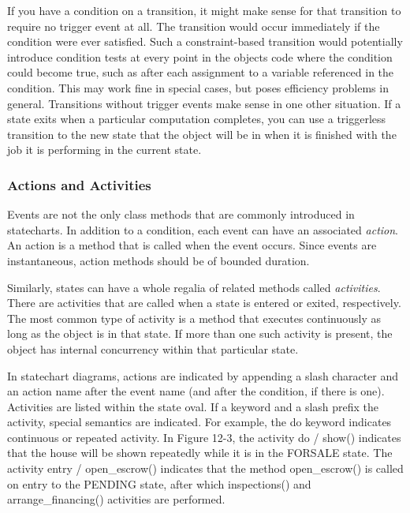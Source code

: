 If you have a condition on a transition, it might make sense for that
transition to require no trigger event at all. The transition would
occur immediately if the condition were ever satisfied. Such a
constraint-based transition would potentially introduce condition tests
at every point in the object{\textquotesingle}s code where the
condition could become true, such as after each assignment to a
variable referenced in the condition. This may work fine in special
cases, but poses efficiency problems in general. Transitions without
trigger events make sense in one other situation. If a state exits when
a particular computation completes, you can use a triggerless
transition to the new state that the object will be in when it is
finished with the job it is performing in the current state.

\subsubsection{Actions and Activities}
Events are not the only class methods that are commonly introduced in
statecharts. In addition to a condition, each event can have an
associated \textit{action}. An action is a
method that is called when the event occurs. Since events are
instantaneous, action methods should be of bounded duration.

Similarly, states can have a whole regalia of related methods called
\textit{activities}. There are activities
that are called when a state is entered or exited, respectively. The
most common type of activity is a method that executes continuously as
long as the object is in that state. If more than one such activity is
present, the object has internal concurrency within that particular
state.

In statechart diagrams, actions are indicated by appending a slash
character and an action name after the event name (and after the
condition, if there is one). Activities are listed within the state
oval. If a keyword and a slash prefix the activity, special semantics
are indicated. For example, the \textsf{do} keyword indicates
continuous or repeated activity. In Figure 12-3, the activity
\textsf{do / show()} indicates that the house will be shown repeatedly
while it is in the FORSALE state. The activity \textsf{entry /
open\_escrow()} indicates that the method \textsf{open\_escrow()} is
called on entry to the PENDING state, after which
\textsf{inspections()} and \textsf{arrange\_financing()} activities are
performed.

